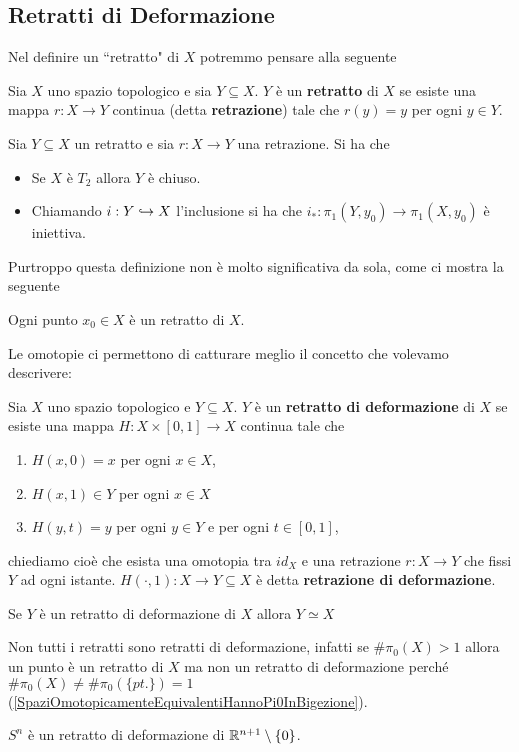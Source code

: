 \begin{multicols*}{2}
\subsection{Retratti di Deformazione}
Nel definire un ``retratto" di $X$ potremmo pensare alla seguente
\begin{definition}[Retratto]
Sia $X$ uno spazio topologico e sia $Y\subseteq X$. $Y$ è un \textbf{retratto} di $X$ se esiste una mappa $r:X\to Y$ continua (detta \textbf{retrazione}) tale che $r(y)=y$ per ogni $y\in Y$.
\end{definition}

\begin{proposition}
Sia $Y\subseteq X$ un retratto e sia $r:X\to Y$ una retrazione. Si ha che
\begin{itemize}[noitemsep]
\item Se $X$ è $T_2$ allora $Y$ è chiuso.
\item Chiamando $i:Y\hookrightarrow X$ l'inclusione si ha che $i_\ast:\pi_1(Y,y_0)\to\pi_1(X,y_0)$ è iniettiva.
\end{itemize}
\end{proposition}
\noindent
Purtroppo questa definizione non è molto significativa da sola, come ci mostra la seguente
\begin{remark}
Ogni punto $x_0\in X$ è un retratto di $X$.
\end{remark}

\noindent Le omotopie ci permettono di catturare meglio il concetto che volevamo descrivere:
\begin{definition}
Sia $X$ uno spazio topologico e $Y\subseteq X$. $Y$ è un \textbf{retratto di deformazione} di $X$ se esiste una mappa $H:X\times[0,1]\to X$ continua tale che
\begin{enumerate}[noitemsep]
\item $H(x,0)=x$ per ogni $x\in X$,
\item $H(x,1)\in Y$ per ogni $x\in X$
\item $H(y,t)=y$ per ogni $y\in Y$ e per ogni $t\in [0,1]$,
\end{enumerate}
chiediamo cioè che esista una omotopia tra $id_X$ e una retrazione $r:X\to Y$ che fissi $Y$ ad ogni istante.
$H(\cdot,1):X\to Y\subseteq X$ è detta \textbf{retrazione di deformazione}.
\end{definition}
\begin{remark}
Se $Y$ è un retratto di deformazione di $X$ allora $Y\simeq X$
\end{remark}
\begin{remark}
Non tutti i retratti sono retratti di deformazione, infatti se $\#\pi_0(X)>1$ allora un punto è un retratto di $X$ ma non un retratto di deformazione perché $\#\pi_0(X)\neq\#\pi_0(\{pt.\})=1$ (\ref{SpaziOmotopicamenteEquivalentiHannoPi0InBigezione}).
\end{remark}
\begin{remark}
$S^n$ è un retratto di deformazione di $\mathbb{R}^{n+1}\setminus\{0\}$.
\end{remark}



\end{multicols*}

